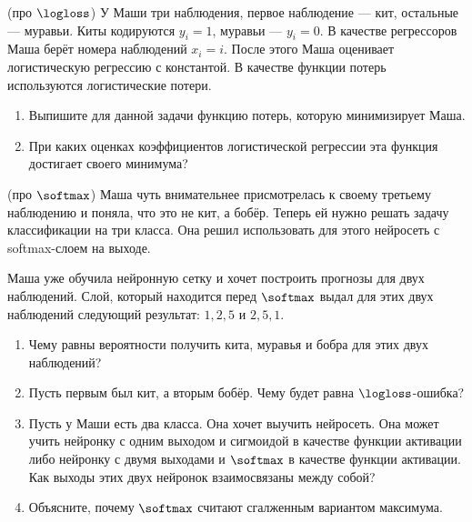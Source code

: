 \begin{problem}{(про $\logloss$)}
	У Маши три наблюдения, первое наблюдение --- кит, остальные --- муравьи. Киты кодируются $y_i = 1$, муравьи --- $y_i = 0$.  В качестве регрессоров Маша берёт номера наблюдений $x_i = i$. После этого Маша оценивает логистическую регрессию с константой. В качестве функции потерь используются логистические потери. 
	
	\begin{enumerate}
		\item Выпишите для данной задачи функцию потерь, которую минимизирует Маша.
		\item При каких оценках коэффициентов логистической регрессии эта функция достигает своего минимума?
	\end{enumerate}
\end{problem}

\begin{problem}{(про $\softmax$)}
	Маша чуть внимательнее присмотрелась к своему третьему наблюдению и поняла, что это не кит, а бобёр. Теперь ей нужно решать задачу классификации на три класса. Она решил использовать для этого нейросеть с softmax-слоем на выходе. 
	
	Маша уже обучила нейронную сетку и хочет построить прогнозы для двух наблюдений. Слой, который находится перед $\softmax$ выдал для этих двух наблюдений следующий результат: $1, 2, 5$ и $2, 5, 1$.
	
	\begin{enumerate}
		\item Чему равны вероятности получить кита, муравья и бобра для этих двух наблюдений? 
		
		\item Пусть первым был кит, а вторым бобёр.  Чему будет равна $\logloss$-ошибка? 
		
		\item Пусть у Маши есть два класса. Она хочет выучить нейросеть. Она может учить нейронку с одним выходом и сигмоидой в качестве функции активации либо нейронку с двумя выходами и $\softmax$ в качестве функции активации. Как выходы этих двух нейронок взаимосвязаны между собой? 

		\item  Объясните, почему $\softmax$  считают сгалженным вариантом максимума.
	\end{enumerate}
\end{problem}

